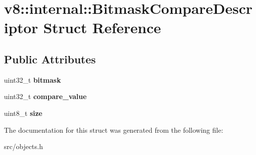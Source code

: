 \hypertarget{structv8_1_1internal_1_1_bitmask_compare_descriptor}{}\section{v8\+:\+:internal\+:\+:Bitmask\+Compare\+Descriptor Struct Reference}
\label{structv8_1_1internal_1_1_bitmask_compare_descriptor}
\subsection*{Public Attributes}
\begin{DoxyCompactItemize}
\item 
\hypertarget{structv8_1_1internal_1_1_bitmask_compare_descriptor_ac1ac0327edc3ec648aaef9cc30a21a49}{}uint32\+\_\+t {\bfseries bitmask}\label{structv8_1_1internal_1_1_bitmask_compare_descriptor_ac1ac0327edc3ec648aaef9cc30a21a49}

\item 
\hypertarget{structv8_1_1internal_1_1_bitmask_compare_descriptor_ab70db12b905fdd8e477869efcc7aee0a}{}uint32\+\_\+t {\bfseries compare\+\_\+value}\label{structv8_1_1internal_1_1_bitmask_compare_descriptor_ab70db12b905fdd8e477869efcc7aee0a}

\item 
\hypertarget{structv8_1_1internal_1_1_bitmask_compare_descriptor_a5874ef711efa555a9d5b9b5b33a46ad6}{}uint8\+\_\+t {\bfseries size}\label{structv8_1_1internal_1_1_bitmask_compare_descriptor_a5874ef711efa555a9d5b9b5b33a46ad6}

\end{DoxyCompactItemize}


The documentation for this struct was generated from the following file\+:\begin{DoxyCompactItemize}
\item 
src/objects.\+h\end{DoxyCompactItemize}
